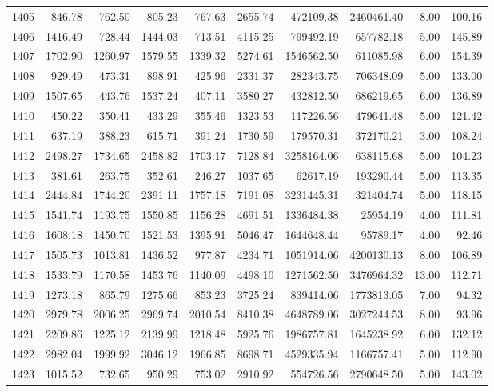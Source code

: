 \begin{tabular}{lrrrrrrrrr}
1405 & 846.78 & 762.50 & 805.23 & 767.63 & 2655.74 & 472109.38 & 2460461.40 & 8.00 & 100.16 \\
1406 & 1416.49 & 728.44 & 1444.03 & 713.51 & 4115.25 & 799492.19 & 657782.18 & 5.00 & 145.89 \\
1407 & 1702.90 & 1260.97 & 1579.55 & 1339.32 & 5274.61 & 1546562.50 & 611085.98 & 6.00 & 154.39 \\
1408 & 929.49 & 473.31 & 898.91 & 425.96 & 2331.37 & 282343.75 & 706348.09 & 5.00 & 133.00 \\
1409 & 1507.65 & 443.76 & 1537.24 & 407.11 & 3580.27 & 432812.50 & 686219.65 & 6.00 & 136.89 \\
1410 & 450.22 & 350.41 & 433.29 & 355.46 & 1323.53 & 117226.56 & 479641.48 & 5.00 & 121.42 \\
1411 & 637.19 & 388.23 & 615.71 & 391.24 & 1730.59 & 179570.31 & 372170.21 & 3.00 & 108.24 \\
1412 & 2498.27 & 1734.65 & 2458.82 & 1703.17 & 7128.84 & 3258164.06 & 638115.68 & 5.00 & 104.23 \\
1413 & 381.61 & 263.75 & 352.61 & 246.27 & 1037.65 & 62617.19 & 193290.44 & 5.00 & 113.35 \\
1414 & 2444.84 & 1744.20 & 2391.11 & 1757.18 & 7191.08 & 3231445.31 & 321404.74 & 5.00 & 118.15 \\
1415 & 1541.74 & 1193.75 & 1550.85 & 1156.28 & 4691.51 & 1336484.38 & 25954.19 & 4.00 & 111.81 \\
1416 & 1608.18 & 1450.70 & 1521.53 & 1395.91 & 5046.47 & 1644648.44 & 95789.17 & 4.00 & 92.46 \\
1417 & 1505.73 & 1013.81 & 1436.52 & 977.87 & 4234.71 & 1051914.06 & 4200130.13 & 8.00 & 106.89 \\
1418 & 1533.79 & 1170.58 & 1453.76 & 1140.09 & 4498.10 & 1271562.50 & 3476964.32 & 13.00 & 112.71 \\
1419 & 1273.18 & 865.79 & 1275.66 & 853.23 & 3725.24 & 839414.06 & 1773813.05 & 7.00 & 94.32 \\
1420 & 2979.78 & 2006.25 & 2969.74 & 2010.54 & 8410.38 & 4648789.06 & 3027244.53 & 8.00 & 93.96 \\
1421 & 2209.86 & 1225.12 & 2139.99 & 1218.48 & 5925.76 & 1986757.81 & 1645238.92 & 6.00 & 132.12 \\
1422 & 2982.04 & 1999.92 & 3046.12 & 1966.85 & 8698.71 & 4529335.94 & 1166757.41 & 5.00 & 112.90 \\
1423 & 1015.52 & 732.65 & 950.29 & 753.02 & 2910.92 & 554726.56 & 2790648.50 & 5.00 & 143.02 \\

\end{tabular}
